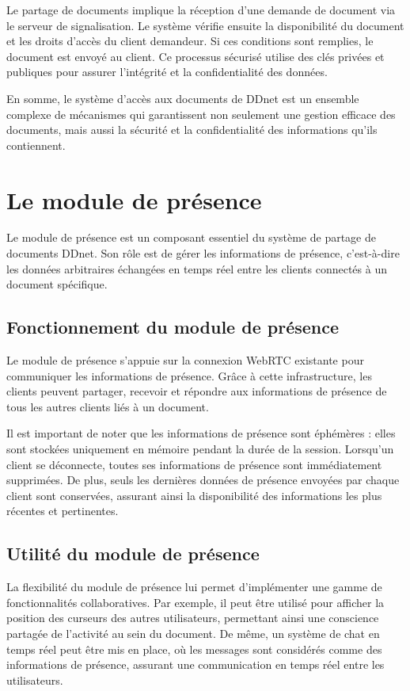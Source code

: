 Le partage de documents implique la réception d'une demande de document via le serveur de signalisation. Le système vérifie ensuite la disponibilité du document et les droits d'accès du client demandeur. Si ces conditions sont remplies, le document est envoyé au client. Ce processus sécurisé utilise des clés privées et publiques pour assurer l'intégrité et la confidentialité des données.

En somme, le système d'accès aux documents de \Gls{DDnet} est un ensemble complexe de mécanismes qui garantissent non seulement une gestion efficace des documents, mais aussi la sécurité et la confidentialité des informations qu'ils contiennent.

\section{Le module de présence}
Le module de présence est un composant essentiel du système de partage de documents \Gls{DDnet}. Son rôle est de gérer les informations de présence, c'est-à-dire les données arbitraires échangées en temps réel entre les clients connectés à un document spécifique.

\subsection{Fonctionnement du module de présence}
Le module de présence s'appuie sur la connexion \Gls{WebRTC} existante pour communiquer les informations de présence. Grâce à cette infrastructure, les clients peuvent partager, recevoir et répondre aux informations de présence de tous les autres clients liés à un document.

Il est important de noter que les informations de présence sont éphémères : elles sont stockées uniquement en mémoire pendant la durée de la session. Lorsqu'un client se déconnecte, toutes ses informations de présence sont immédiatement supprimées. De plus, seuls les dernières données de présence envoyées par chaque client sont conservées, assurant ainsi la disponibilité des informations les plus récentes et pertinentes.

\subsection{Utilité du module de présence}
La flexibilité du module de présence lui permet d'implémenter une gamme de fonctionnalités collaboratives. Par exemple, il peut être utilisé pour afficher la position des curseurs des autres utilisateurs, permettant ainsi une conscience partagée de l'activité au sein du document. De même, un système de chat en temps réel peut être mis en place, où les messages sont considérés comme des informations de présence, assurant une communication en temps réel entre les utilisateurs.

